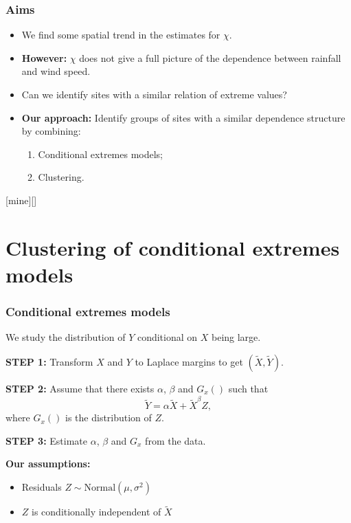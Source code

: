 \documentclass[xcolor=dvipsnames,aspectratio=43]{beamer}
\begin{document}
\begin{frame}
\frametitle{Aims}
\begin{itemize}
\item We find some spatial trend in the estimates for $\chi$.\vspace{0.4cm}
\item \textbf{However:} $\chi$ does not give a full picture of the dependence between rainfall and wind speed.\vspace{0.4cm}
\item Can we identify sites with a similar relation of extreme values?\vspace{0.2cm}\pause
\item \textbf{Our approach:} Identify groups of sites with a similar dependence structure by combining:\vspace{0.2cm}
\begin{enumerate}
\item Conditional extremes models;\vspace{0.2cm}
\item Clustering.
\end{enumerate}
\end{itemize}
\end{frame}

[mine][]
\section*{Clustering of conditional extremes models}

\begin{frame}
\sectionpage
\end{frame}

\begin{frame}
\frametitle{Conditional extremes models}
We study the distribution of $Y$ conditional on $X$ being large.\vspace{0.2cm}

\textbf{STEP 1:} Transform $X$ and $Y$ to Laplace margins to get $(\tilde{X},\tilde{Y})$.\vspace{0.2cm}
 
\textbf{STEP 2:} Assume that there exists $\alpha$, $\beta$ and $G_x()$ such that
\[
\tilde{Y} = \alpha \tilde{X}  + {\tilde{X}^\beta} Z, 
\]
where $G_x()$ is the distribution of $Z$.\vspace{0.2cm}

\textbf{STEP 3:} Estimate $\alpha$, $\beta$ and $G_x$ from the data. \vspace{0.4cm}\pause

\textbf{Our assumptions:}
\begin{itemize}
\item Residuals $Z \sim \mathrm{Normal}(\mu, \sigma^2)$ 
\item $Z$ is conditionally independent of $\tilde{X}$
\end{itemize}
\end{frame}
\end{document}
